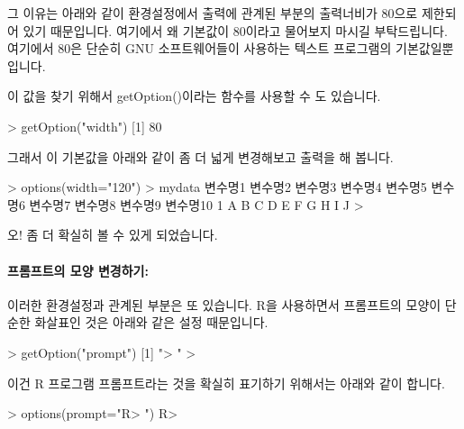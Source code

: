 그 이유는 아래와 같이 환경설정에서 출력에 관계된 부분의 출력너비가 80으로 제한되어 있기 때문입니다. 
여기에서 왜 기본값이 80이라고 물어보지 마시길 부탁드립니다. 
여기에서 80은 단순히 GNU 소프트웨어들이 사용하는 텍스트 프로그램의 기본값일뿐입니다.

\begin{Schunk}
\end{Schunk}

이 값을 찾기 위해서 getOption()이라는 함수를 사용할 수 도 있습니다. 

\begin{Schunk}
\begin{Soutput}
> getOption("width")
[1] 80
\end{Soutput}
\end{Schunk}

그래서 이 기본값을 아래와 같이 좀 더 넓게 변경해보고 출력을 해 봅니다. 

\begin{Schunk}
\begin{Soutput}
> options(width="120")
> mydata
  변수명1 변수명2 변수명3 변수명4 변수명5 변수명6 변수명7 변수명8 변수명9 변수명10
1       A       B       C       D       E       F       G       H       I        J
> 
\end{Soutput}
\end{Schunk}

오! 좀 더 확실히 볼 수 있게 되었습니다. 

\paragraph{프롬프트의 모양 변경하기:}  이러한 환경설정과 관계된 부분은 또 있습니다. 
R을 사용하면서 프롬프트의 모양이 단순한 화살표인 것은 아래와 같은 설정 때문입니다.

\begin{Schunk}
\begin{Soutput}
> getOption("prompt")
[1] "> "
> 
\end{Soutput}
\end{Schunk}

이건 R 프로그램 프롬프트라는 것을 확실히 표기하기 위해서는 아래와 같이 합니다. 

\begin{Schunk}
\begin{Soutput}
> options(prompt="R> ")
R> 
\end{Soutput}
\end{Schunk}

